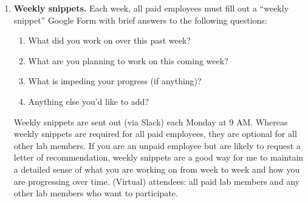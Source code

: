 \documentclass{tufte-book} %
\begin{document}
\begin{enumerate}
    \item \textbf{Weekly snippets.} Each week, all
      paid employees must fill out a ``weekly snippet'' Google Form
      with brief answers to the following questions:
      \begin{enumerate}
      \item What did you work on over this past week?
      \item What are you planning to work on this coming week?
      \item What is impeding your progress (if anything)?
      \item Anything else you'd like to add?
      \end{enumerate}
      Weekly snippets are sent out (via Slack) each Monday at 9 AM.
      Whereas weekly snippets are required for all paid employees,
      they are optional for all other lab members.  If you are an
      unpaid employee but are likely to request a letter of
      recommendation, weekly snippets are a good way for me to
      maintain a detailed sense of what you are working on from week
      to week and how you are progressing over time.  (Virtual)
      attendees: all paid lab members and any other lab members who
      want to participate.
\end{enumerate}

{}
\end{document}
